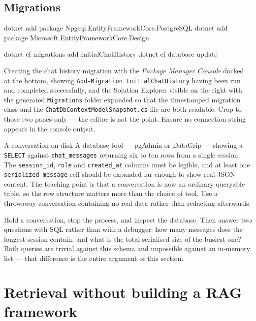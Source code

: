 \subsection{Migrations}

\begin{shellcmd}
dotnet add package Npgsql.EntityFrameworkCore.PostgreSQL
dotnet add package Microsoft.EntityFrameworkCore.Design

dotnet ef migrations add InitialChatHistory
dotnet ef database update
\end{shellcmd}

%
{Creating the chat history migration}%
{\vsver{} with the \emph{Package Manager Console} docked at the bottom, showing
\texttt{Add-Migration InitialChatHistory} having been run and completed
successfully, and the Solution Explorer visible on the right with the generated
\texttt{Migrations} folder expanded so that the timestamped migration class and
the \texttt{ChatDbContextModelSnapshot.cs} file are both readable. Crop to those
two panes only --- the editor is not the point. Ensure no connection string
appears in the console output.}

%
{A conversation on disk}%
{A database tool --- pgAdmin or DataGrip --- showing a \texttt{SELECT} against
\texttt{chat\_messages} returning six to ten rows from a single session. The
\texttt{session\_id}, \texttt{role} and \texttt{created\_at} columns must be
legible, and at least one \texttt{serialized\_message} cell should be expanded
far enough to show real JSON content. The teaching point is that a conversation
is now an ordinary queryable table, so the row structure matters more than the
choice of tool. Use a throwaway conversation containing no real data rather than
redacting afterwards.}

\begin{exercisebox}
Hold a conversation, stop the process, and inspect the database. Then answer two
questions with SQL rather than with a debugger: how many messages does the
longest session contain, and what is the total serialised size of the busiest
one? Both queries are trivial against this schema and impossible against an
in-memory list --- that difference is the entire argument of this section.
\end{exercisebox}

\section{Retrieval without building a RAG framework}
\label{sec:retrieval}

